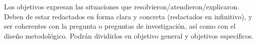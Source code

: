 Los objetivos expresan las situaciones que resolvieron/atendieron/explicaron. Deben de estar redactados en forma clara y concreta (redactados en infinitivo), y ser coherentes con la pregunta o preguntas de investigación, así como con el diseño metodológico.
Podrán dividirlos en objetivo general y objetivos específicos.